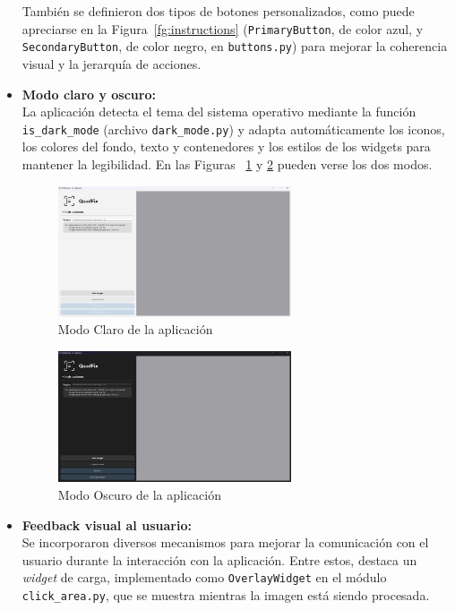 \begin{itemize}
    También se definieron dos tipos de botones personalizados, como puede apreciarse en la Figura~\ref{fg:instructions} (\texttt{PrimaryButton}, de color azul, y \texttt{SecondaryButton}, de color negro, en \texttt{buttons.py}) para mejorar la coherencia visual y la jerarquía de acciones.
    
    \item \textbf{Modo claro y oscuro:} \\
    La aplicación detecta el tema del sistema operativo mediante la función \texttt{is\_dark\_mode} (archivo \texttt{dark\_mode.py}) y adapta automáticamente los iconos, los colores del fondo, texto y contenedores y los estilos de los widgets para mantener la legibilidad. En las Figuras ~\ref{fg:light} y \ref{fg:dark} pueden verse los dos modos.

    \begin{figure}[H]
        \centering	\includegraphics[width=0.65\textwidth]{figures/3.3.Light.png}
        \caption{Modo Claro de la aplicación}\label{fg:light}
    \end{figure}

    \begin{figure}[H]
        \centering	\includegraphics[width=0.65\textwidth]{figures/3.3.Dark.png}
        \caption{Modo Oscuro de la aplicación}\label{fg:dark}
    \end{figure}
    
    \item \textbf{Feedback visual al usuario:} \\
    Se incorporaron diversos mecanismos para mejorar la comunicación con el usuario durante la interacción con la aplicación. Entre estos, destaca un \textit{widget} de carga, implementado como \texttt{OverlayWidget} en el módulo \texttt{click\_area.py}, que se muestra mientras la imagen está siendo procesada.
    

\end{itemize}
